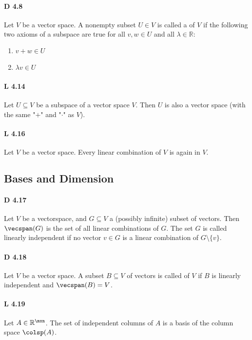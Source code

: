 \paragraph{D 4.8} Let $V$ be a vector space. A nonempty subset $U\in
V$ is called a  of $V$ if the following two axioms of a subspace
are true for all $v,w\in U$ and all $\lambda\in\mathbb{R}$:
\begin{enumerate}
    \item $v+w\in U$
    \item $\lambda v\in U$
\end{enumerate}

\paragraph{L 4.14} Let $U\subseteq V$ be a subspace of a vector space $V$.
Then $U$ is also a vector space (with the same "$+$" and "$\cdot$" as $V$).

\paragraph{L 4.16} Let $V$ be a vector space.
Every linear combination of $V$ is again in $V$.

\subsection{Bases and Dimension}

\paragraph{D 4.17} Let $V$ be a vectorspace, and $G\subseteq V$ a (possibly infinite) subset of vectors. Then $\vecspan(G)$ is the set of all linear combinations of $G$. The set $G$ is called linearly independent if no vector $v\in G$ is a linear combination of $G\setminus\{v\}$.

\paragraph{D 4.18} Let $V$ be a vector space. A subset $B\subseteq V$
of vectors is called  of $V$ if $B$ is linearly independent and
$\vecspan(B)=V$.

\paragraph{L 4.19} Let $A\in\mathbb{R}^{\mxn}$. The set of independent
columns of $A$ is a basis of the column space $\colsp(A)$.


